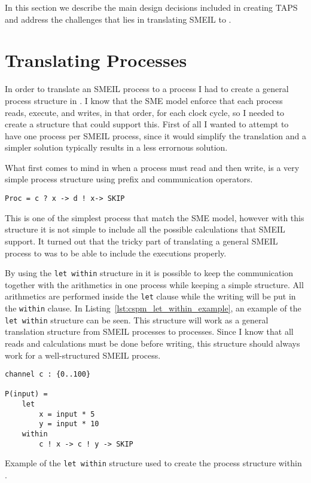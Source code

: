 In this section we describe the main design decisions included in creating TAPS and address the challenges that lies in translating SMEIL to \cspm{}.
\section{Translating Processes}
In order to translate an SMEIL process to a \cspm{} process I had to create a general process structure in \cspm{}. I know that the SME model enforce that each process reads, execute, and writes, in that order, for each clock cycle, so I needed to create a \cspm{} structure that could support this. First of all I wanted to attempt to have one \cspm{} process per SMEIL process, since it would simplify the translation and a simpler solution typically results in a less errornous solution.

What first comes to mind in \cspm{} when a process must read and then write, is a very simple process structure using prefix and communication operators.
\begin{verbatim}
Proc = c ? x -> d ! x-> SKIP
\end{verbatim}
This is one of the simplest \cspm{} process that match the SME model, however with this structure it is not simple to include all the possible calculations that SMEIL support. It turned out that the tricky part of translating a general SMEIL process to \cspm{} was to be able to include the executions properly.

By using the \texttt{let within} structure in \cspm{} it is possible to keep the communication together with the arithmetics in one \cspm{} process while keeping a simple structure. All arithmetics are performed inside the \texttt{let} clause while the writing will be put in the \texttt{within} clause.
In Listing~\ref{lst:cspm_let_within_example}, an example of the \texttt{let within} structure can be seen. This structure will work as a general translation structure from SMEIL processes to \cspm{} processes. Since I know that all reads and calculations must be done before writing, this structure should always work for a well-structured SMEIL process.
\begin{listing}
\begin{verbatim}
channel c : {0..100}

P(input) =
    let
        x = input * 5
        y = input * 10
    within
        c ! x -> c ! y -> SKIP
\end{verbatim}
\caption{Example of the \texttt{let within} structure used to create the process structure within \cspm{}.}
\label{lst:cspm_let_within_example}
\end{listing}
